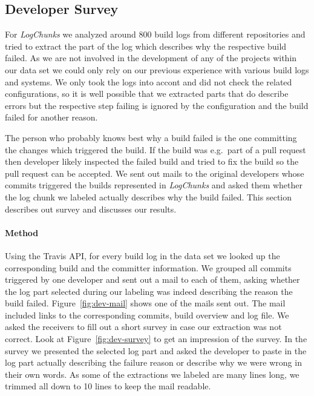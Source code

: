 \documentclass[\myrootdir/main.tex]{subfiles}
\begin{document}
\subsection{Developer Survey}
For \emph{LogChunks} we analyzed around 800 build logs from different repositories and tried to extract the part of the log which describes why the respective build failed.
As we are not involved in the development of any of the projects within our data set we could only rely on our previous experience with various build logs and systems.
We only took the logs into accont and did not check the related configurations, so it is well possible that we extracted parts that do describe errors but the respective step failing is ignored by the configuration and the build failed for another reason.

The person who probably knows best why a build failed is the one committing the changes which triggered the build.
If the build was e.g.\ part of a pull request then developer likely inspected the failed build and tried to fix the build so the pull request can be accepted.
We sent out mails to the original developers whose commits triggered the builds represented in \emph{LogChunks} and asked them whether the log chunk we labeled actually describes why the build failed.
This section describes out survey and discusses our results.

\paragraph{Method}
Using the Travis API, for every build log in the data set we looked up the corresponding build and the committer information.
We grouped all commits triggered by one developer and sent out a mail to each of them, asking whether the log part selected during our labeling was indeed describing the reason the build failed.
Figure~\ref{fig:dev-mail} shows one of the mails sent out.
The mail included links to the corresponding commits, build overview and log file.
We asked the receivers to fill out a short survey in case our extraction was not correct.
Look at Figure~\ref{fig:dev-survey} to get an impression of the survey.
In the survey we presented the selected log part and asked the developer to paste in the log part actually describing the failure reason or describe why we were wrong in their own words.
As some of the extractions we labeled are many lines long, we trimmed all down to 10 lines to keep the mail readable.
\end{document}
